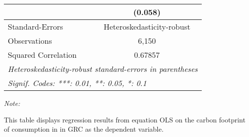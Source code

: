 \begin{table}[htbp!]
\begin{adjustbox}{width = 1\textwidth, max height = 0.95\textheight, center}
\begin{threeparttable}[b]
\begin{tabular}{lc}
                                & (0.058)\\   
            \midrule 
            Standard-Errors     & Heteroskedasticity-robust \\   
            Observations        & 6,150\\  
            Squared Correlation & 0.67857\\  
            \midrule \midrule
            \multicolumn{2}{l}{\emph{Heteroskedasticity-robust standard-errors in parentheses}}\\
            \multicolumn{2}{l}{\emph{Signif. Codes: ***: 0.01, **: 0.05, *: 0.1}}\\
         \end{tabular}
         
         \begin{tablenotes}\item \medskip \textit{Note:}
            \item This table displays regression results from equation OLS on the carbon footprint of consumption in  in GRC as the dependent variable.  
         \end{tablenotes}
      \end{threeparttable}
   \end{adjustbox}
\end{table}


